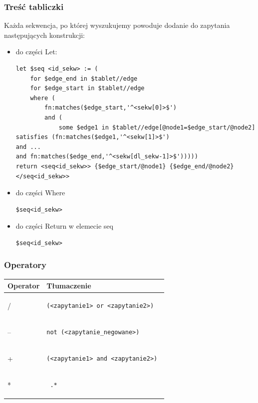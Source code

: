 \subsubsection{Treść tabliczki}
Każda sekwencja, po której wyszukujemy powoduje dodanie do zapytania następujących konstrukcji:
\begin{itemize}
\item{do części Let:}
\begin{verbatim}
let $seq <id_sekw> := (
	for $edge_end in $tablet//edge
	for $edge_start in $tablet//edge
	where (
		fn:matches($edge_start,'^<sekw[0]>$')
		and (
			some $edge1 in $tablet//edge[@node1=$edge_start/@node2]
satisfies (fn:matches($edge1,'^<sekw[1]>$')
and ... 
and fn:matches($edge_end,'^<sekw[dl_sekw-1]>$')))))
return <seq<id_sekw>> {$edge_start/@node1} {$edge_end/@node2} </seq<id_sekw>>
\end{verbatim}
\item{do części Where}
\begin{verbatim}
$seq<id_sekw>
\end{verbatim}
\item{do części Return w elemecie seq}
\begin{verbatim}
$seq<id_sekw>
\end{verbatim}
\end{itemize}




\subsubsection{Operatory}
\begin{longtable}{|p{1in}|p{3in}|}
\hline
{\bf Operator} & {\bf Tłumaczenie}\\
\hline
\endhead
/ & \begin{verbatim}(<zapytanie1> or <zapytanie2>) \end{verbatim} \\
\hline
-- & \begin{verbatim}not (<zapytanie_negowane>) \end{verbatim}\\  
\hline
+ & \begin{verbatim}(<zapytanie1> and <zapytanie2>) \end{verbatim}\\ 
\hline
* & \begin{verbatim} .*\end{verbatim}  \\ 
\hline
\end{longtable}

